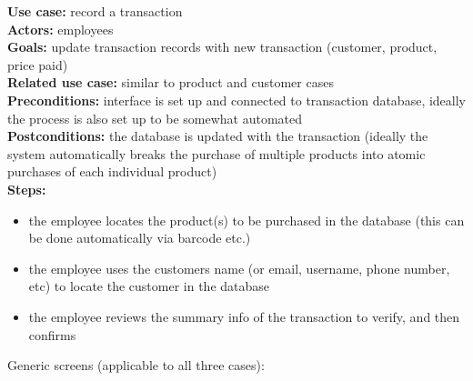 \documentclass[notitlepage, 11pt]{report}
\begin{document}
\begin{enumerate}[itemindent=-1.5em]
	\textbf{Use case:} record a transaction\\
	\textbf{Actors:} employees\\
	\textbf{Goals:} update transaction records with new transaction (customer, product, price paid)\\
	\textbf{Related use case:} similar to product and customer cases\\
	\textbf{Preconditions:} interface is set up and connected to transaction database, ideally the process is also set up to be somewhat automated\\
	\textbf{Postconditions:} the database is updated with the transaction (ideally the system automatically breaks the purchase of multiple products into atomic purchases of each individual product)\\
\newpage
	\textbf{Steps:} 
		\begin{itemize}
		\item the employee locates the product(s) to be purchased in the database (this can be done automatically via barcode etc.)
		\item the employee uses the customers name (or email, username, phone number, etc) to locate the customer in the database
		\item the employee reviews the summary info of the transaction to verify, and then confirms
		\end{itemize}
	\begin{center} 
	Generic screens (applicable to all three cases):
	

\end{center}
\end{enumerate}
\end{document}
